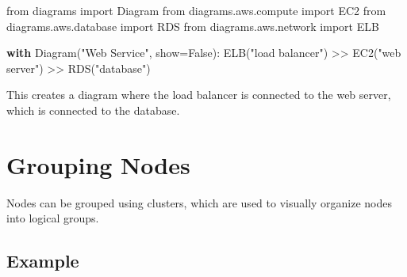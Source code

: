 \documentclass[
  letterpaper,
  DIV=11,
  numbers=noendperiod]{scrreprt}
\newenvironment{Shaded}{\begin{snugshade}}{\end{snugshade}}
\newcommand{\ControlFlowTok}[1]{\textcolor[rgb]{0.00,0.23,0.31}{\textbf{#1}}}
\newcommand{\ImportTok}[1]{\textcolor[rgb]{0.00,0.46,0.62}{#1}}
\newcommand{\NormalTok}[1]{\textcolor[rgb]{0.00,0.23,0.31}{#1}}
\newcommand{\OperatorTok}[1]{\textcolor[rgb]{0.37,0.37,0.37}{#1}}
\newcommand{\StringTok}[1]{\textcolor[rgb]{0.13,0.47,0.30}{#1}}
\newcommand{\VariableTok}[1]{\textcolor[rgb]{0.07,0.07,0.07}{#1}}
\begin{document}
\begin{Shaded}
\begin{Highlighting}[]
\ImportTok{from}\NormalTok{ diagrams }\ImportTok{import}\NormalTok{ Diagram}
\ImportTok{from}\NormalTok{ diagrams.aws.compute }\ImportTok{import}\NormalTok{ EC2}
\ImportTok{from}\NormalTok{ diagrams.aws.database }\ImportTok{import}\NormalTok{ RDS}
\ImportTok{from}\NormalTok{ diagrams.aws.network }\ImportTok{import}\NormalTok{ ELB}

\ControlFlowTok{with}\NormalTok{ Diagram(}\StringTok{"Web Service"}\NormalTok{, show}\OperatorTok{=}\VariableTok{False}\NormalTok{):}
\NormalTok{    ELB(}\StringTok{"load balancer"}\NormalTok{) }\OperatorTok{\textgreater{}\textgreater{}}\NormalTok{ EC2(}\StringTok{"web server"}\NormalTok{) }\OperatorTok{\textgreater{}\textgreater{}}\NormalTok{ RDS(}\StringTok{"database"}\NormalTok{)}
\end{Highlighting}
\end{Shaded}

This creates a diagram where the load balancer is connected to the web
server, which is connected to the database.

\section{Grouping Nodes}\label{grouping-nodes}

Nodes can be grouped using clusters, which are used to visually organize
nodes into logical groups.

\subsection{Example}\label{example-38}
\end{document}
